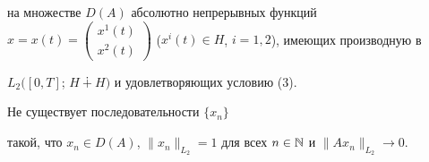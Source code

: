 на множестве $D(A)$ абсолютно непрерывных функций $x=x(t)=\left(


\begin{smallmatrix}x^{1}(t)\\ x^{2}(t)\end{smallmatrix}


\right)$ ($x^{i}(t)\in H$, $i=1,2$), имеющих производную в


$L_{2}([0,T]$; $H\dotplus H)$ и удовлетворяющих условию (3).





\begin{lem}


Не существует последовательности $\{x_{n}\}$


такой, что $x_{n}\in D(A)$, $\|x_{n}\|_{L_{2}}=1$ для всех $n\in


\Bbb N $ и $\|Ax_{n}\|_{L_{2}}\to 0$.


\end{lem}





